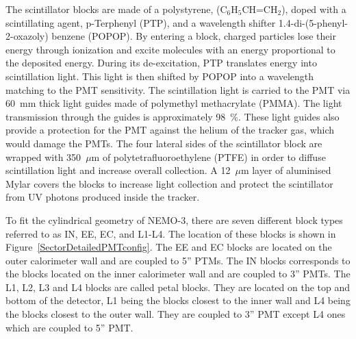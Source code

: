 \documentclass[main.tex]{subfiles}
\begin{document}
\NI The scintillator blocks are made of a polystyrene, (C$_\text{6}$H$_\text{5}$CH=CH$_\text{2}$), doped with a scintillating agent, p-Terphenyl (PTP), and a wavelength shifter 1.4-di-(5-phenyl-2-oxazoly) benzene (POPOP). By entering a block, charged particles lose their energy through ionization and excite molecules with an energy proportional to the deposited energy. During its de-excitation, PTP translates energy into scintillation light. This light is then shifted by POPOP into a wavelength matching to the PMT sensitivity. The scintillation light is carried to the PMT via 60~mm thick light guides made of polymethyl methacrylate (PMMA). The light transmission through the guides is approximately 98~\%. These light guides also provide a protection for the PMT against the helium of the tracker gas, which would damage the PMTs. The four lateral sides of the scintillator block are wrapped with 350~$\mu$m of polytetrafluoroethylene (PTFE) in order to diffuse scintillation light and increase overall collection. A 12~$\mu$m layer of aluminised Mylar covers the blocks to increase light collection and protect the scintillator from UV photons produced inside the tracker.


\bigskip




\bigskip


\NI To fit the cylindrical geometry of NEMO-3, there are seven different block types referred to as IN, EE, EC, and L1-L4. The location of these blocks is shown in Figure~\ref{SectorDetailedPMTconfig}. The EE and EC blocks are located on the outer calorimeter wall and are coupled to 5'' PTMs. The IN blocks corresponds to the blocks located on the inner calorimeter wall and are coupled to 3'' PMTs. The L1, L2, L3 and L4 blocks are called petal blocks. They are located on the top and bottom of the detector, L1 being the blocks closest to the inner wall and L4 being the blocks closest to the outer wall. They are coupled to 3'' PMT except L4 ones which are coupled to 5'' PMT.  
\end{document}
